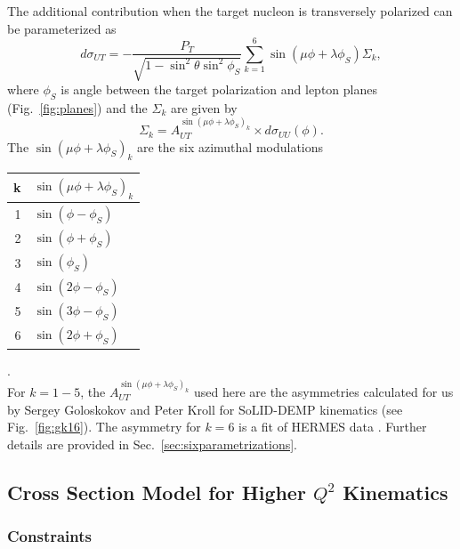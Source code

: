 The additional contribution when the target nucleon is transversely polarized
can be parameterized \cite{Di05,hermes-thesis} as
\begin{equation}
  d\sigma_{UT} = -\frac{P_{T}}{\sqrt{1 - \sin^{2}{\theta} \sin^{2}{\phi_{S}} }
  } \sum_{k=1}^{6} \sin{ (\mu\phi + \lambda\phi_{S})
  } \Sigma_{k},
\label{eqn:cross-3}
\end{equation}
where $\phi_{S}$ is angle between the target polarization and lepton planes
(Fig.~\ref{fig:planes}) and the $\Sigma_{k}$ are given by
\begin{equation}
  \Sigma_{k} = A_{UT}^{\sin{( \mu\phi+\lambda\phi_{S})_{k}}} \times
  d\sigma_{UU}(\phi).
  \label{eqn:sigmas}
\end{equation}
The $\sin{( \mu\phi+\lambda\phi_{S})_{k}}$ are the six azimuthal modulations
\begin{tabular}{|r|l|}
\hline
k & $\sin{(\mu\phi + \lambda\phi_{S})_{k}}$ \\
\hline
1 & $\sin{(\phi - \phi_{S})}$ \\ 
\hline
2 & $\sin{(\phi + \phi_{S})}$ \\ 
\hline
3 & $\sin{(\phi_{S})}$ \\ 
\hline
4 & $\sin{(2\phi - \phi_{S})}$ \\ 
\hline
5 & $\sin{(3\phi - \phi_{S})}$ \\ 
\hline
6 & $\sin{(2\phi + \phi_{S})}$ \\ 
\hline
\end{tabular}
.\\
For $k=1-5$, the $A_{UT}^{\sin{( \mu\phi+\lambda\phi_{S})_{k}}}$ used here are
the asymmetries calculated for us by Sergey Goloskokov and Peter Kroll
\cite{GoPC} for SoLID-DEMP kinematics (see Fig.~\ref{fig:gk16}).  The asymmetry
for $k=6$ is a fit of HERMES data \cite{hermes-thesis}.  Further details are
provided in Sec.~\ref{sec:sixparametrizations}.

\subsection{Cross Section Model for Higher $Q^2$ Kinematics
\label{sec:model}}

\subsubsection{Constraints}

